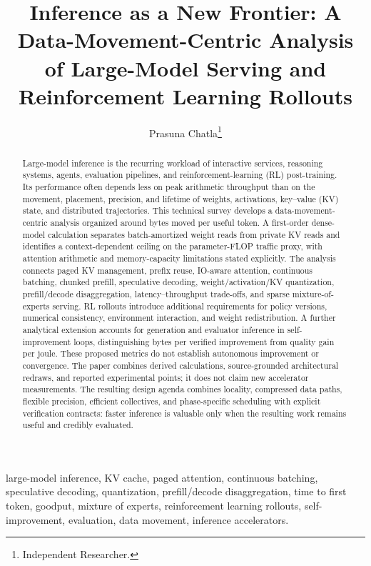 \documentclass[journal]{IEEEtran}
\title{Inference as a New Frontier: A Data-Movement-Centric Analysis of Large-Model Serving and Reinforcement Learning Rollouts}
\author{Prasuna Chatla\thanks{Independent Researcher.}}
\begin{document}
\maketitle

\begin{abstract}
Large-model inference is the recurring workload of interactive services, reasoning systems, agents, evaluation pipelines, and reinforcement-learning (RL) post-training. Its performance often depends less on peak arithmetic throughput than on the movement, placement, precision, and lifetime of weights, activations, key--value (KV) state, and distributed trajectories. This technical survey develops a data-movement-centric analysis organized around bytes moved per useful token. A first-order dense-model calculation separates batch-amortized weight reads from private KV reads and identifies a context-dependent ceiling on the parameter-FLOP traffic proxy, with attention arithmetic and memory-capacity limitations stated explicitly. The analysis connects paged KV management, prefix reuse, IO-aware attention, continuous batching, chunked prefill, speculative decoding, weight/activation/KV quantization, prefill/decode disaggregation, latency--throughput trade-offs, and sparse mixture-of-experts serving. RL rollouts introduce additional requirements for policy versions, numerical consistency, environment interaction, and weight redistribution. A further analytical extension accounts for generation and evaluator inference in self-improvement loops, distinguishing bytes per verified improvement from quality gain per joule. These proposed metrics do not establish autonomous improvement or convergence. The paper combines derived calculations, source-grounded architectural redraws, and reported experimental points; it does not claim new accelerator measurements. The resulting design agenda combines locality, compressed data paths, flexible precision, efficient collectives, and phase-specific scheduling with explicit verification contracts: faster inference is valuable only when the resulting work remains useful and credibly evaluated.
\end{abstract}

\begin{IEEEkeywords}
large-model inference, KV cache, paged attention, continuous batching, speculative decoding, quantization, prefill/decode disaggregation, time to first token, goodput, mixture of experts, reinforcement learning rollouts, self-improvement, evaluation, data movement, inference accelerators.
\end{IEEEkeywords}
\end{document}
